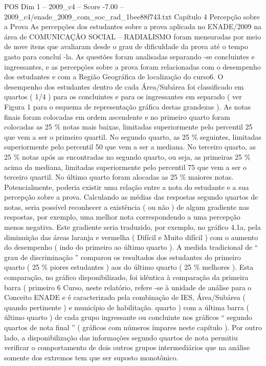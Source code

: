 \begin{textsample}{POS Dim 1 – 2009\_c4 – Score -7.00 – 2009\_c4/enade\_2009\_com\_soc\_rad\_1bee88f743.txt}  \label{ex:f1_pos_415}
Capítulo 4 Percepção sobre a Prova As percepções dos estudantes sobre a prova aplicada no ENADE/2009 na área de COMUNICAÇÃO SOCIAL – RADIALISMO foram mensuradas por meio de nove itens que avaliaram desde o grau de dificuldade da prova até o tempo gasto para concluí -la.
As questões foram analisadas separando -se concluintes e ingressantes, e as percepções sobre a prova foram relacionadas com o desempenho dos estudantes e com a Região Geográfica de localização do curso6.
O desempenho dos estudantes dentro de cada Área/Subárea foi classificado em quartos ( 1/4 ) para os concluintes e para os ingressantes em separado ( ver Figura 1 para o esquema de representação gráfica destas grandezas ).
As notas finais foram colocadas em ordem ascendente e no primeiro quarto foram colocadas as 25 \% notas mais baixas, limitadas superiormente pelo percentil 25 que vem a ser o primeiro quartil.
No segundo quarto, as 25 \% seguintes, limitadas superiormente pelo percentil 50 que vem a ser a mediana.
No terceiro quarto, as 25 \% notas após as encontradas no segundo quarto, ou seja, as primeiras 25 \% acima da mediana, limitadas superiormente pelo percentil 75 que vem a ser o terceiro quartil.
No último quarto foram alocadas as 25 \% maiores notas.
Potencialmente, poderia existir uma relação entre a nota do estudante e a sua percepção sobre a prova.
Calculando as médias das respostas segundo quartos de notas, seria possível reconhecer a existência ( ou não ) de algum gradiente nas respostas, por exemplo, uma melhor nota correspondendo a uma percepção menos negativa.
Este gradiente seria traduzido, por exemplo, no gráfico 4.1a, pela diminuição das áreas laranja e vermelha ( Difícil e Muito difícil ) com o aumento do desempenho ( indo do primeiro ao último quarto ).
A medida tradicional de “ grau de discriminação ” comparou os resultados dos estudantes do primeiro quarto ( 25 \% piores estudantes ) aos do último quarto ( 25 \% melhores ).
Esta comparação, no gráfico disponibilizado, foi idêntica à comparação da primeira barra ( primeiro 6 Curso, neste relatório, refere -se à unidade de análise para o Conceito ENADE e é caracterizado pela combinação de IES, Área/Subárea ( quando pertinente ) e município de habilitação. quarto ) com a última barra ( último quarto ) de cada grupo ingressante ou concluinte nos gráficos “ segundo quartos de nota final ” ( gráficos com números ímpares neste capítulo ).
Por outro lado, a disponibilização das informações segundo quartos de nota permitiu verificar o comportamento de dois outros grupos intermediários que na análise somente dos extremos tem que ser suposto monotônico.

\end{textsample}
